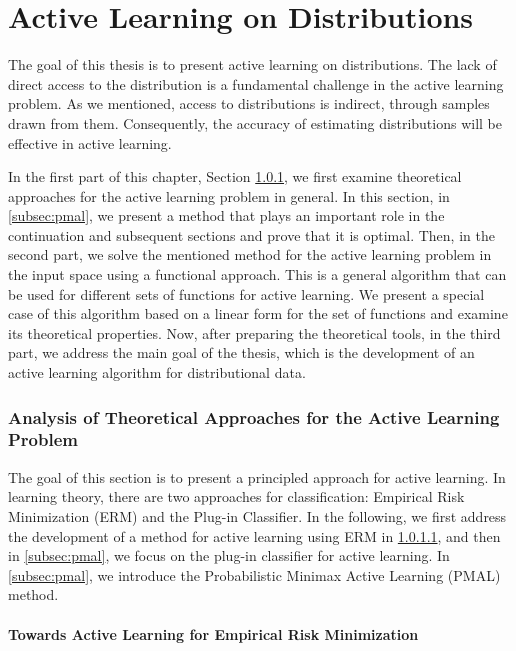 \chapter{Active Learning on Distributions}
	The goal of this thesis is to present active learning on distributions. The lack of direct access to the distribution is a fundamental challenge in the active learning problem. As we mentioned, access to distributions is indirect, through samples drawn from them. Consequently, the accuracy of estimating distributions will be effective in active learning.
	
	In the first part of this chapter, Section \ref{sec:theoretical}, we first examine theoretical approaches for the active learning problem in general. In this section, in \ref{subsec:pmal}, we present a method that plays an important role in the continuation and subsequent sections and prove that it is optimal. Then, in the second part, we solve the mentioned method for the active learning problem in the input space using a functional approach. This is a general algorithm that can be used for different sets of functions for active learning. We present a special case of this algorithm based on a linear form for the set of functions and examine its theoretical properties. Now, after preparing the theoretical tools, in the third part, we address the main goal of the thesis, which is the development of an active learning algorithm for distributional data.
	
	\subsection{Analysis of Theoretical Approaches for the Active Learning Problem}
	\label{sec:theoretical}
	
	The goal of this section is to present a principled approach for active learning. In learning theory, there are two approaches for classification: Empirical Risk Minimization (ERM) and the Plug-in Classifier. In the following, we first address the development of a method for active learning using ERM in \ref{subsec:erm-al}, and then in \ref{subsec:pmal}, we focus on the plug-in classifier for active learning. In \ref{subsec:pmal}, we introduce the Probabilistic Minimax Active Learning (PMAL) method.
	
	\subsubsection{Towards Active Learning for Empirical Risk Minimization}
	\label{subsec:erm-al}
	
